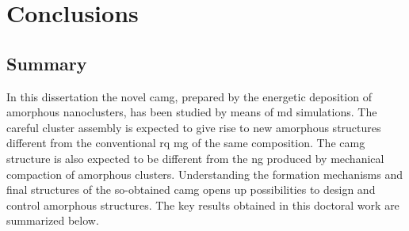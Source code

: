 \chapter{Conclusions} \label{c:conclusions}

\section{Summary}
In this dissertation the novel \cz \gls{camg}, prepared by the energetic deposition of amorphous nanoclusters, has been studied by means of \gls{md} simulations. The careful cluster assembly is expected to give rise to new amorphous structures different from the conventional \gls{rq} \gls{mg} of the same composition. The \gls{camg} structure is also expected to be different from the \gls{ng} produced by mechanical compaction of amorphous clusters. Understanding the formation mechanisms and final structures of the so-obtained \gls{camg} opens up possibilities to design and control amorphous structures. The key results obtained in this doctoral work are summarized below. \par

